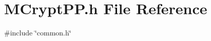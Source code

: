 \section{M\+Crypt\+P\+P.\+h File Reference}
\label{MCryptPP_8h}
{\ttfamily \#include \char`\"{}common.\+h\char`\"{}}\newline
